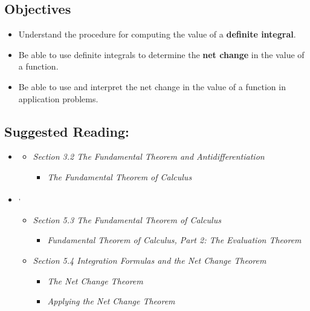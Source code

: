 
\vspace{-0.25 in}
\begin{framed}
\subsection*{Objectives}
\begin{itemize}
    \item Understand the procedure for computing the value of a \textbf{definite integral}.
    \item Be able to use definite integrals to determine the \textbf{net change} in the value of a function.
    \item Be able to use and interpret the net change in the value of a function in application problems. 
\end{itemize}

\subsection*{Suggested Reading:}
\begin{itemize}
\item \cite{Calaway}\footnotemark[1]
   \begin{itemize}
        \item \emph{Section 3.2 The Fundamental Theorem and Antidifferentiation}
        \begin{itemize}
            \item \emph{The Fundamental Theorem of Calculus}
        \end{itemize}
    \end{itemize}

\item \cite{openstax}\footnotemark[2]\textsuperscript{,}\footnotemark[3]
    \begin{itemize}
        \item \emph{Section 5.3 The Fundamental Theorem of Calculus}
        \begin{itemize}
            \item \emph{Fundamental Theorem of Calculus, Part 2: The Evaluation Theorem}
        \end{itemize}
        \item \emph{Section 5.4 Integration Formulas and the Net Change Theorem}
        \begin{itemize}
            \item \emph{The Net Change Theorem}
            \item \emph{Applying the Net Change Theorem}
        \end{itemize}
    \end{itemize}
    

\end{itemize}
\end{framed}
